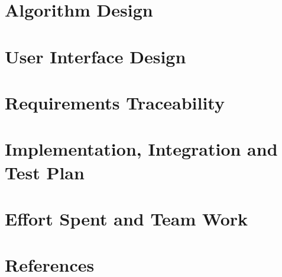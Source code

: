 	\clearpage
	\section{Algorithm Design}
	\label{sect:algorithmDesign}
	
	
	\clearpage
	\section{User Interface Design}
	\label{sect:userInterfaceDesign}
	

	
	\clearpage
	\section{Requirements Traceability}
	\label{sect:traceability}
	
	
	\clearpage
	\section{Implementation, Integration and Test Plan}
	\label{sect:i&tPlan}
	
	
	\clearpage
	\section{Effort Spent and Team Work}
	\label{sect:effort&team}
	
	
	\clearpage
	\section{References}
	\label{sect:references}
	
	
	
